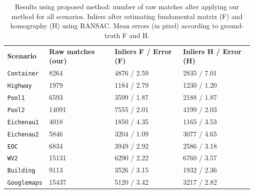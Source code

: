 \begin{table}[t]
  \begin{center}
  \small 
  \begin{tabular}{@{}p{.15\linewidth}p{.13\linewidth}p{.12\linewidth}p{.12\linewidth}@{}}
    \toprule
    {\textbf{Scenario}} & {\textbf{Raw matches (our)}} & {\textbf{Inliers F / Error (F)}} & {\textbf{Inliers H / Error (H)}} \\
    \cmidrule(r){1-4}
  \texttt{Container}  &  8264 &  4876 / 2.59 & 2835 / 7.01 \\ %
  \texttt{Highway}    &  1979 &  1184 / 2.79 & 1230 / 1.20 \\ %
  \texttt{Pool1}      &  6593 &  3599 / 1.87 & 2188 / 1.87 \\ %
  \texttt{Pool2}      & 14091 &  7555 / 2.01 & 4199 / 2.03 \\ %
  \texttt{Eichenau1}  &  4018 &  1850 / 4.35 & 1165 / 3.53 \\ %
  \texttt{Eichenau2}  &  5846 &  3204 / 1.09 & 3077 / 4.65 \\ %
  \texttt{EOC}        &  6834 &  3949 / 2.92 & 2586 / 3.18 \\ %
  \texttt{WV2}        & 15131 &  6290 / 2.22 & 6760 / 3.57 \\ %
  \texttt{Building}   &  9113 &  3526 / 3.15 & 1932 / 2.36 \\ %
  \texttt{Googlemaps} & 15437 &  5120 / 3.42 & 3217 / 2.82 \\
  \bottomrule
  \end{tabular}
  \end{center}
  \caption {Results using proposed method: number of raw matches after applying our method for all scenarios. Inliers after estimating fundamental matrix (F) and homography (H) using RANSAC. Mean errors (in pixel) according to ground-truth F and H.}
\label{tab:Result}
\end{table}


